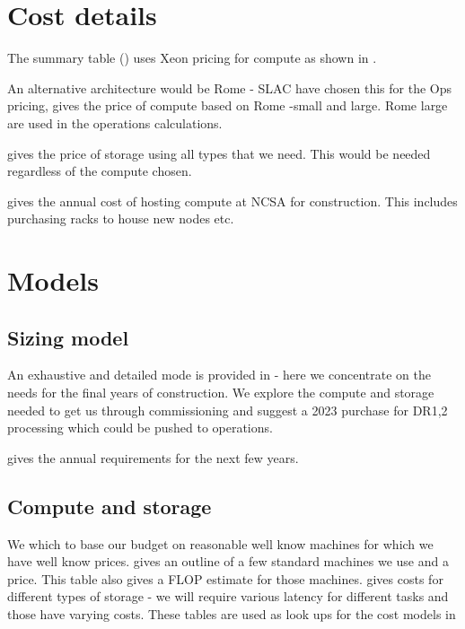 


\section{Cost details}
The summary table ()  uses Xeon pricing for compute as shown in
.


An alternative architecture would be Rome - SLAC have chosen this for the Ops pricing,  gives the price of compute based on Rome -small and large.
Rome large are used in the operations calculations.


 gives the price of storage using all  types that we need.
This would be needed regardless of the compute chosen.


 gives the annual cost of hosting compute at NCSA for construction.
This includes purchasing racks to house
new nodes etc.





\section{ Models}\label{sec:model}
\subsection{Sizing model}\label{sec:sizemodel}

An exhaustive and detailed mode is provided in   - here we concentrate on the needs for the
final years of construction. We explore the compute and storage needed to get us through commissioning and suggest a 2023 purchase for DR1,2 processing which could be pushed to operations.

 gives the annual requirements for the next few years.



\subsection{Compute and storage }\label{sec:csmodel}
We which to base our budget on reasonable well know machines for which we have well know prices.
 gives an outline of a few standard machines we use and a price. This table also gives a FLOP estimate
for those machines.
 gives costs for different types of storage - we will require various latency for different tasks
and those have varying costs.
These tables are used as look ups for the cost models in 

